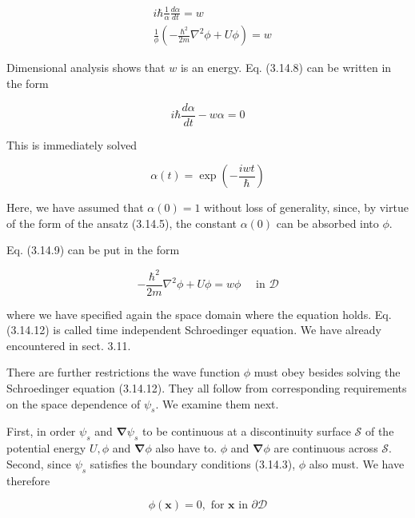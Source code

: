 \documentclass{article}
\begin{document}
\begin{align*}
& i \hbar \frac{1}{\alpha} \frac{d \alpha}{d t}=w  \tag{3.14.8}\\
& \frac{1}{\phi}\left(-\frac{\hbar^{2}}{2 m} \nabla^{2} \phi+U \phi\right)=w \tag{3.14.9}
\end{align*}
 

Dimensional analysis shows that $w$ is an energy.
Eq. (3.14.8) can be written in the form
 
\begin{equation*}
i \hbar \frac{d \alpha}{d t}-w \alpha=0 \tag{3.14.10}
\end{equation*}
 

This is immediately solved
 
\begin{equation*}
\alpha(t)=\exp \left(-\frac{i w t}{\hbar}\right) \tag{3.14.11}
\end{equation*}
 

Here, we have assumed that $\alpha(0)=1$ without loss of generality, since, by virtue of the form of the ansatz (3.14.5), the constant $\alpha(0)$ can be absorbed into $\phi$.

Eq. (3.14.9) can be put in the form
 
\begin{equation*}
-\frac{\hbar^{2}}{2 m} \nabla^{2} \phi+U \phi=w \phi \quad \text { in } \mathcal{D} \tag{3.14.12}
\end{equation*}
 
where we have specified again the space domain where the equation holds. Eq. (3.14.12) is called time independent Schroedinger equation. We have already encountered in sect. 3.11.

There are further restrictions the wave function $\phi$ must obey besides solving the Schroedinger equation (3.14.12). They all follow from corresponding requirements on the space dependence of $\psi_{s}$. We examine them next.

First, in order $\psi_{s}$ and $\boldsymbol{\nabla} \psi_{s}$ to be continuous at a discontinuity surface $\mathcal{S}$ of the potential energy $U, \phi$ and $\boldsymbol{\nabla} \phi$ also have to.
$\phi$ and $\boldsymbol{\nabla} \phi$ are continuous across $\mathcal{S}$.
Second, since $\psi_{s}$ satisfies the boundary conditions (3.14.3), $\phi$ also must. We have therefore
 
\begin{equation*}
\phi(\boldsymbol{x})=0, \text { for } \boldsymbol{x} \text { in } \partial \mathcal{D} \tag{3.14.13}
\end{equation*}
 
\end{document}
